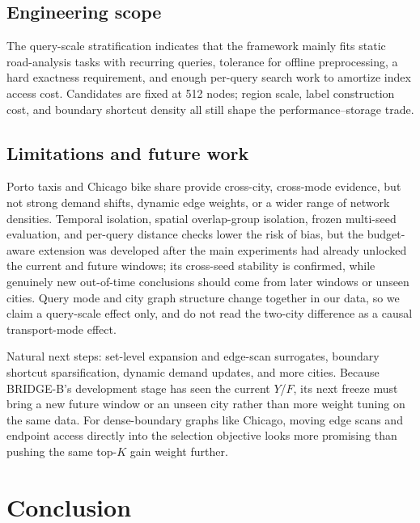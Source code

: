\documentclass[5p,twocolumn,authoryear]{elsarticle}
\newcommand{\bmethod}{BRIDGE-B}
\begin{document}
\subsection{Engineering scope}

The query-scale stratification indicates that the framework mainly fits static
road-analysis tasks with recurring queries, tolerance for offline preprocessing, a hard
exactness requirement, and enough per-query search work to amortize index access cost.
Candidates are fixed at 512 nodes; region scale, label construction cost, and boundary
shortcut density all still shape the performance--storage trade.

\subsection{Limitations and future work}

Porto taxis and Chicago bike share provide cross-city, cross-mode evidence, but not strong
demand shifts, dynamic edge weights, or a wider range of network densities. Temporal
isolation, spatial overlap-group isolation, frozen multi-seed evaluation, and per-query
distance checks lower the risk of bias, but the budget-aware extension was developed after
the main experiments had already unlocked the current and future windows; its cross-seed
stability is confirmed, while genuinely new out-of-time conclusions should come from later
windows or unseen cities. Query mode and city graph structure change together in our data,
so we claim a query-scale effect only, and do not read the two-city difference as a causal
transport-mode effect.

Natural next steps: set-level expansion and edge-scan surrogates, boundary shortcut
sparsification, dynamic demand updates, and more cities. Because \bmethod's development
stage has seen the current $Y$/$F$, its next freeze must bring a new future window or an
unseen city rather than more weight tuning on the same data. For dense-boundary graphs
like Chicago, moving edge scans and endpoint access directly into the selection objective
looks more promising than pushing the same top-$K$ gain weight further.

\section{Conclusion}
\end{document}
